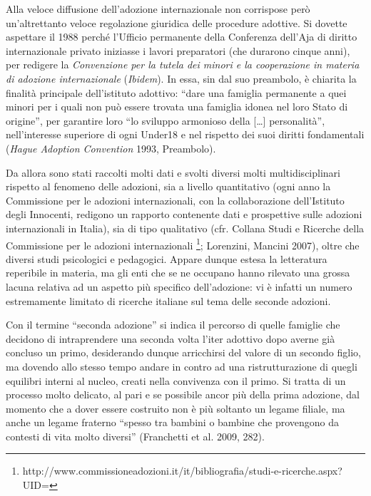 \documentclass[12pt,oneside,svgnames]{memoir}
\begin{document}
Alla veloce diffusione dell'adozione internazionale non corrispose però
un'altrettanto veloce regolazione giuridica delle procedure adottive. Si
dovette aspettare il 1988 perché l'Ufficio permanente della Conferenza
dell'Aja di diritto internazionale privato iniziasse i lavori
preparatori (che durarono cinque anni), per redigere la
\emph{Convenzione per la tutela dei minori e la cooperazione in materia
di adozione internazionale} (\emph{Ibidem}). In essa, sin dal suo
preambolo, è chiarita la finalità principale dell'istituto adottivo:
``dare una famiglia permanente a quei minori per i quali non può essere
trovata una famiglia idonea nel loro Stato di origine'', per garantire
loro ``lo sviluppo armonioso della {[}\ldots{}{]} personalità'',
nell'interesse superiore di ogni Under18 e nel rispetto dei suoi diritti
fondamentali (\emph{Hague Adoption Convention} 1993, Preambolo).

Da allora sono stati raccolti molti dati e svolti diversi molti
multidisciplinari rispetto al fenomeno delle adozioni, sia a livello
quantitativo (ogni anno la Commissione per le adozioni internazionali,
con la collaborazione dell'Istituto degli Innocenti, redigono un
rapporto contenente dati e prospettive sulle adozioni internazionali in
Italia), sia di tipo qualitativo (cfr. Collana Studi e Ricerche della
Commissione per le adozioni internazionali \footnote{http://www.commissioneadozioni.it/it/bibliografia/studi-e-ricerche.aspx?UID=};
Lorenzini, Mancini 2007), oltre che diversi studi psicologici e
pedagogici. Appare dunque estesa la letteratura reperibile in materia,
ma gli enti che se ne occupano hanno rilevato una grossa lacuna relativa
ad un aspetto più specifico dell'adozione: vi è infatti un numero
estremamente limitato di ricerche italiane sul tema delle seconde
adozioni.

Con il termine ``seconda adozione'' si indica il percorso di quelle
famiglie che decidono di intraprendere una seconda volta l'iter adottivo
dopo averne già concluso un primo, desiderando dunque arricchirsi del
valore di un secondo figlio, ma dovendo allo stesso tempo andare in
contro ad una ristrutturazione di quegli equilibri interni al nucleo,
creati nella convivenza con il primo. Si tratta di un processo molto
delicato, al pari e se possibile ancor più della prima adozione, dal
momento che a dover essere costruito non è più soltanto un legame
filiale, ma anche un legame fraterno ``spesso tra bambini o bambine che
provengono da contesti di vita molto diversi'' (Franchetti et al. 2009,
282).
\end{document}
